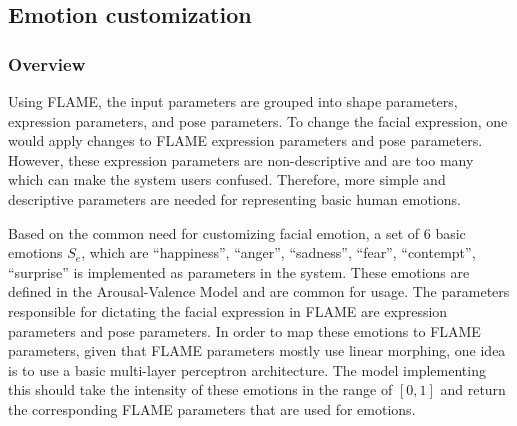 \subsection{Emotion customization}

\subsubsection{Overview}

Using FLAME, the input parameters are grouped into shape parameters, expression parameters, and pose parameters. To change the facial expression, one would apply changes to FLAME expression parameters and pose parameters. However, these expression parameters are non-descriptive and are too many which can make the system users confused. Therefore, more simple and descriptive parameters are needed for representing basic human emotions.

Based on the common need for customizing facial emotion, a set of 6 basic emotions $S_e$, which are ``happiness'', ``anger'', ``sadness'', ``fear'', ``contempt'', ``surprise'' is implemented as parameters in the system. These emotions are defined in the Arousal-Valence Model and are common for usage. The parameters responsible for dictating the facial expression in FLAME are expression parameters and pose parameters. In order to map these emotions to FLAME parameters, given that FLAME parameters mostly use linear morphing, one idea is to use a basic multi-layer perceptron architecture. The model implementing this should take the intensity of these emotions in the range of $[0,1]$ and return the corresponding FLAME parameters that are used for emotions.